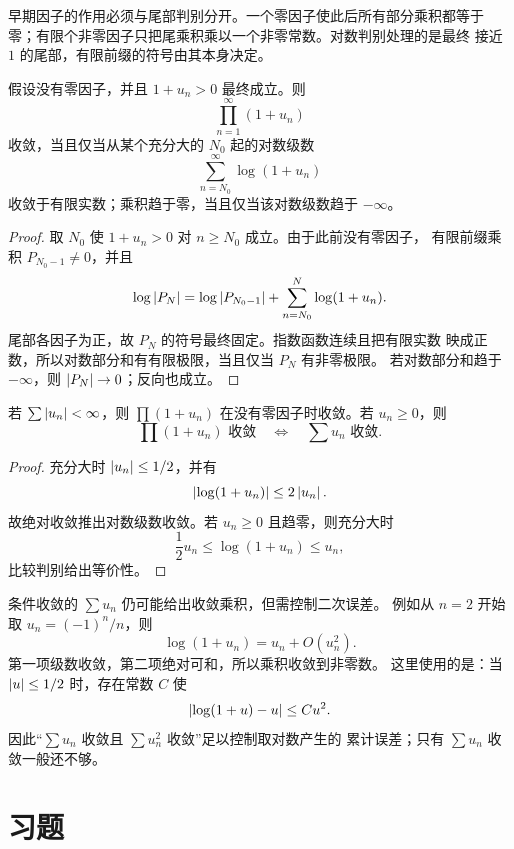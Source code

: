 早期因子的作用必须与尾部判别分开。一个零因子使此后所有部分乘积都等于
零；有限个非零因子只把尾乘积乘以一个非零常数。对数判别处理的是最终
接近 \(1\) 的尾部，有限前缀的符号由其本身决定。

\begin{theorem}[正因子的对数判别]
\label{thm:infinite-product-log}
假设没有零因子，并且 \(1+u_n>0\) 最终成立。则
\[
 \prod_{n=1}^\infty(1+u_n)
\]
收敛，当且仅当从某个充分大的 \(N_0\) 起的对数级数
\[
 \sum_{n=N_0}^\infty\log(1+u_n)
\]
收敛于有限实数；乘积趋于零，当且仅当该对数级数趋于 \(-\infty\)。
\end{theorem}

\begin{proof}
取 \(N_0\) 使 \(1+u_n>0\) 对 \(n\ge N_0\) 成立。由于此前没有零因子，
有限前缀乘积 \(P_{N_0-1}\ne0\)，并且
\[
 \log\left|P_N\right|=\log\left|P_{N_0-1}\right|
 +\sum_{n=N_0}^N\log(1+u_n).
\]
尾部各因子为正，故 \(P_N\) 的符号最终固定。指数函数连续且把有限实数
映成正数，所以对数部分和有有限极限，当且仅当 \(P_N\) 有非零极限。
若对数部分和趋于 \(-\infty\)，则 \(\left|P_N\right|\to0\)；反向也成立。
\end{proof}

\begin{corollary}
若 \(\sum\left|u_n\right|<\infty\)，则
\(\prod(1+u_n)\) 在没有零因子时收敛。若 \(u_n\ge0\)，则
\[
 \prod(1+u_n)\text{ 收敛}
\quad\Longleftrightarrow\quad
\sum u_n\text{ 收敛}.
\]
\end{corollary}

\begin{proof}
充分大时 \(\left|u_n\right|\le1/2\)，并有
\[
 \left|\log(1+u_n)\right|\le2\left|u_n\right|.
\]
故绝对收敛推出对数级数收敛。若 \(u_n\ge0\) 且趋零，则充分大时
\[
 \frac12u_n\le\log(1+u_n)\le u_n,
\]
比较判别给出等价性。
\end{proof}

条件收敛的 \(\sum u_n\) 仍可能给出收敛乘积，但需控制二次误差。
例如从 \(n=2\) 开始取 \(u_n=(-1)^n/n\)，则
\[
 \log(1+u_n)=u_n+O(u_n^2).
\]
第一项级数收敛，第二项绝对可和，所以乘积收敛到非零数。
这里使用的是：当 \(\left|u\right|\le1/2\) 时，存在常数 \(C\) 使
\[
 \left|\log(1+u)-u\right|\le C u^2.
\]
因此“\(\sum u_n\) 收敛且 \(\sum u_n^2\) 收敛”足以控制取对数产生的
累计误差；只有 \(\sum u_n\) 收敛一般还不够。

\section*{习题}

